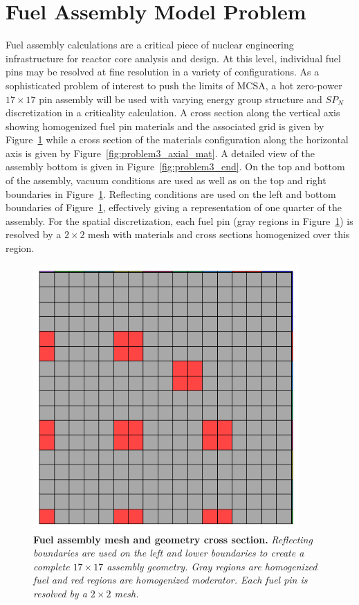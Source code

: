 \documentclass[letterpaper,11pt]{article}
\begin{document}
\section{Fuel Assembly Model Problem}
\label{sec:fuel_assembly}
Fuel assembly calculations are a critical piece of nuclear engineering
infrastructure for reactor core analysis and design. At this level,
individual fuel pins may be resolved at fine resolution in a variety
of configurations. As a sophisticated problem of interest to push the
limits of MCSA, a hot zero-power $17 \times 17$ pin assembly will be
used with varying energy group structure and $SP_N$ discretization in
a criticality calculation. A cross section along the vertical axis
showing homogenized fuel pin materials and the associated grid is
given by Figure~\ref{fig:problem3_radial_mat} while a cross section of
the materials configuration along the horizontal axis is given by
Figure~\ref{fig:problem3_axial_mat}. A detailed view of the assembly
bottom is given in Figure~\ref{fig:problem3_end}. On the top and
bottom of the assembly, vacuum conditions are used as well as on the
top and right boundaries in
Figure~\ref{fig:problem3_radial_mat}. Reflecting conditions are used
on the left and bottom boundaries of
Figure~\ref{fig:problem3_radial_mat}, effectively giving a
representation of one quarter of the assembly. For the spatial
discretization, each fuel pin (gray regions in
Figure~\ref{fig:problem3_radial_mat}) is resolved by a $2 \times 2$
mesh with materials and cross sections homogenized over this region.
\begin{figure}[t!]
  \begin{center}
    \includegraphics[width=4in]{problem3_radial_mat.png}
  \end{center}
  \caption{\textbf{Fuel assembly mesh and geometry cross section.}
    \textit{Reflecting boundaries are used on the left and lower
      boundaries to create a complete $17 \times 17$ assembly
      geometry. Gray regions are homogenized fuel and red regions are
      homogenized moderator. Each fuel pin is resolved by a $2 \times
      2$ mesh.}}
  \label{fig:problem3_radial_mat}
\end{figure}
\end{document}
